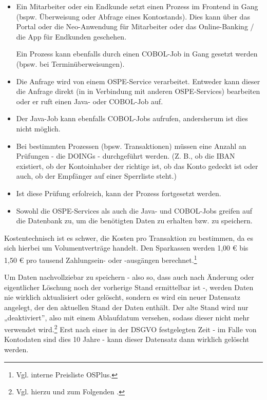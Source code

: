 \begin{itemize}
    \item Ein Mitarbeiter oder ein Endkunde setzt einen Prozess im Frontend in Gang (bspw. Überweisung oder Abfrage eines Kontostands).
    Dies kann über das Portal oder die Neo-Anwendung für Mitarbeiter oder das Online-Banking / die App für Endkunden geschehen.

    Ein Prozess kann ebenfalls durch einen COBOL-Job in Gang gesetzt werden (bpsw. bei Terminüberweisungen).
    \item Die Anfrage wird von einem OSPE-Service verarbeitet.
    Entweder kann dieser die Anfrage direkt (in in Verbindung mit anderen OSPE-Services) bearbeiten oder er ruft einen Java- oder COBOL-Job auf.
    \item Der Java-Job kann ebenfalls COBOL-Jobs aufrufen, andersherum ist dies nicht möglich.
    \item Bei bestimmten Prozessen (bpsw. Transaktionen) müssen eine Anzahl an Prüfungen - die DOINGs - durchgeführt werden. 
    (Z. B., ob die IBAN existiert, ob der Kontoinhaber der richtige ist, ob das Konto gedeckt ist oder auch, ob der Empfänger auf einer Sperrliste steht.) 
    \item Ist diese Prüfung erfolreich, kann der Prozess fortgesetzt werden.
    \item Sowohl die OSPE-Services als auch die Java- und COBOL-Jobs greifen auf die Datenbank zu, um die benötigten Daten zu erhalten bzw. zu speichern. 
\end{itemize}

Kostentechnisch ist es schwer, die Kosten pro Transaktion zu bestimmen, da es sich hierbei um Volumentverträge handelt.
Den Sparkassen werden 1,00 € bis 1,50 € pro tausend Zahlungsein- oder -ausgängen berechnet.\footnote{Vgl. interne Preisliste OSPlus.}

\bigbreak
\bigbreak

\noindent
Um Daten nachvollziebar zu speichern - also so, dass auch nach Änderung oder eigentlicher Löschung noch der vorherige Stand ermittelbar ist -, werden Daten nie wirklich aktualisiert oder gelöscht, sondern es wird ein neuer Datensatz angelegt, der den aktuellen Stand der Daten enthält.
Der alte Stand wird nur „deaktiviert”, also mit einem Ablaufdatum versehen, sodass dieser nicht mehr verwendet wird.\footnote{Vgl. hierzu und zum Folgenden \pageref{i1:f2}.}
Erst nach einer in der DSGVO festgelegten Zeit - im Falle von Kontodaten sind dies 10 Jahre - kann dieser Datensatz dann wirklich gelöscht werden.




